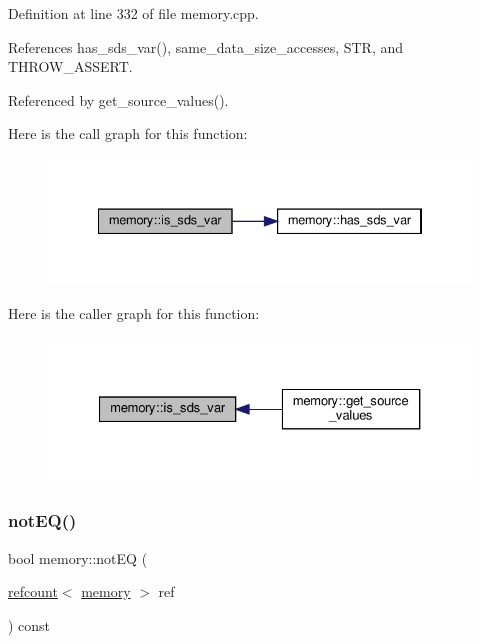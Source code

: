Definition at line 332 of file memory.\+cpp.



References has\+\_\+sds\+\_\+var(), same\+\_\+data\+\_\+size\+\_\+accesses, S\+TR, and T\+H\+R\+O\+W\+\_\+\+A\+S\+S\+E\+RT.



Referenced by get\+\_\+source\+\_\+values().

Here is the call graph for this function\+:
\nopagebreak
\begin{figure}[H]
\begin{center}
\leavevmode
\includegraphics[width=334pt]{d8/d99/classmemory_aa55b7b58d5ccf69ab5f8a79207750079_cgraph}
\end{center}
\end{figure}
Here is the caller graph for this function\+:
\nopagebreak
\begin{figure}[H]
\begin{center}
\leavevmode
\includegraphics[width=327pt]{d8/d99/classmemory_aa55b7b58d5ccf69ab5f8a79207750079_icgraph}
\end{center}
\end{figure}
\mbox{\label{classmemory_a08892c0a65916344ca6b744256d764d7}} 
\subsubsection{\texorpdfstring{not\+E\+Q()}{notEQ()}}
{\footnotesize\ttfamily bool memory\+::not\+EQ (\begin{DoxyParamCaption}\item[{\hyperlink{structrefcount}{refcount}$<$ \hyperlink{classmemory}{memory} $>$}]{ref }\end{DoxyParamCaption}) const}



